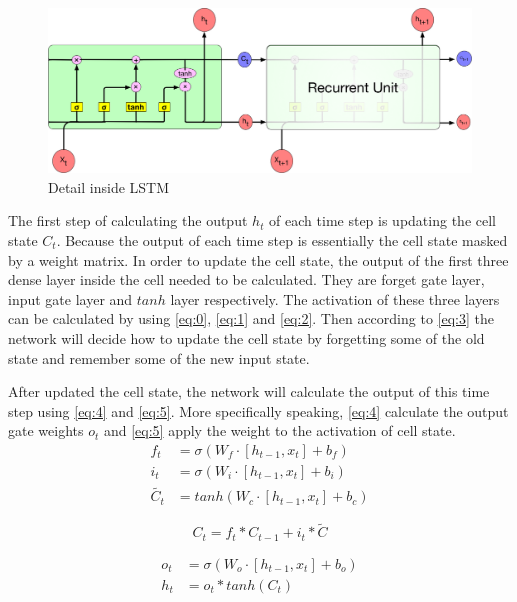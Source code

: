 \begin{figure}[h] 
	\centering
	\includegraphics[width=6.0in]{Figures/recurrent4}
	\caption[Detail inside LSTM]{Detail inside LSTM}
	\label{fig:3}
\end{figure}

The first step of calculating the output $h_t$ of each time step is updating the cell state $C_t$. Because the output of each time step is essentially the cell state masked by a weight matrix. In order to update the cell state, the output of the first three dense layer inside the cell needed to be calculated. They are forget gate layer, input gate layer and $tanh$ layer respectively. The activation of these three layers can be calculated by using \ref{eq:0}, \ref{eq:1} and \ref{eq:2}. Then according to  \ref{eq:3} the network will decide how to update the cell state by forgetting some of the old state and remember some of the new input state.\par
After updated the cell state, the network will calculate the output of this time step using \ref{eq:4} and \ref{eq:5}. More specifically speaking, \ref{eq:4} calculate the output gate weights $o_t$ and  \ref{eq:5} apply the weight to the activation of cell state. 
\begin{subequations} 
    \begin{align}
    	f_{ t }&=\sigma (W_{ f }\cdot [h_{t-1} , x_t] +b_f) \label{eq:0}\\	
        i_t &= \sigma(W_i \cdot[h_{t-1}, x_t] + b_i)\label{eq:1}\\
        \tilde {  {C _t } } &= tanh(W_c\cdot [h_{t-1}, x_t]+ b_c) \label{eq:2}
    \end{align}	
\end{subequations}




\begin{equation} \label{eq:3}
    C_t = f_t\ast C_{t-1} +i_t\ast \tilde{C}
\end{equation}

\begin{subequations}
    \begin{align}
        o_t &= \sigma(W_o\cdot [h_{t-1}, x_t] +b_o) \label{eq:4}\\
        h_t &= o_t \ast tanh(C_t) \label{eq:5}
    \end{align}
\end{subequations}

